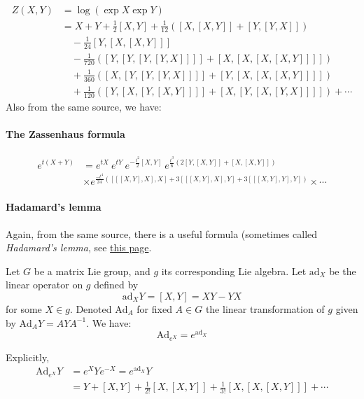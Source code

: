     \begin{align}
        Z(X,Y)&=\log(\exp X\exp Y) \nonumber\\
            &= X + Y + \frac{1}{2}[X,Y] +
            \frac{1}{12}\left ([X,[X,Y]] +[Y,[Y,X]]\right ) \nonumber\\
            &\quad
            - \frac {1}{24}[Y,[X,[X,Y]]] \nonumber\\
            &\quad
            - \frac{1}{720}\left([Y,[Y,[Y,[Y,X]]]] + [X,[X,[X,[X,Y]]]] \right)
            \nonumber \\
            &\quad +\frac{1}{360}\left([X,[Y,[Y,[Y,X]]]] + [Y,[X,[X,[X,Y]]]]\right)
            \nonumber\\
            &\quad
            + \frac{1}{120}\left([Y,[X,[Y,[X,Y]]]] + [X,[Y,[X,[Y,X]]]]\right)
            + \cdots
    \end{align}
    Also from the same source, we have:
    \paragraph{The Zassenhaus formula}
    \begin{align}
        e^{t(X+Y)} &= e^{tX}~ e^{tY} ~e^{-\frac{t^2}{2} [X,Y]} ~
        e^{\frac{t^3}{6}(2[Y,[X,Y]]+ [X,[X,Y]] )} \nonumber\\
        & \times
          e^{\frac{-t^4}{24}([[[X,Y],X],X] + 3[[[X,Y],X],Y] + 3[[[X,Y],Y],Y]) }
        \times\cdots
    \end{align}

    \paragraph{Hadamard's lemma}
    Again, from the same source, there is a useful formula (sometimes called
    \textit{Hadamard’s lemma}, see
    \href{http://www.physicspages.com/2016/11/17/exponentials-of-operators-hadamards-lemma/}{this
    page}.

    \begin{lemma}
        Let $G$ be a matrix Lie group, and $g$ its corresponding Lie algebra.
        Let $\mathrm{ad}_X$ be the linear operator on $g$ defined by
        $$\mathrm{ad}_X Y=[X,Y]=XY-YX$$
        for some $X\in g$. Denoted $\mathrm{Ad}_A$ for fixed $A\in G$ the linear
        transformation of $g$ given by $\mathrm{Ad}_A Y = AYA^{-1}$. We have:
        \begin{equation}
            \mathrm{Ad}_{e^X} = e^{\mathrm{ad}_X}
        \end{equation}
    \end{lemma}
    Explicitly,
    \begin{align}
        \mathrm{Ad}_{e^X}Y &= e^X Y e^{-X} = e^{\mathrm{ad}_X}Y  \nonumber\\
        &= Y + [X,Y] + \frac{1}{2!}[X,[X,Y]] + \frac{1}{3!}[X,[X,[X,Y]]] + \cdots
    \end{align}

